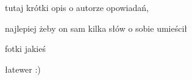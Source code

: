 \documentclass[./MAIN.tex]{subfiles}
\begin{document}
tutaj krótki opis o autorze opowiadań,

najlepiej żeby on sam kilka słów o sobie umieścił

fotki jakieś

łatewer :)
\end{document}
